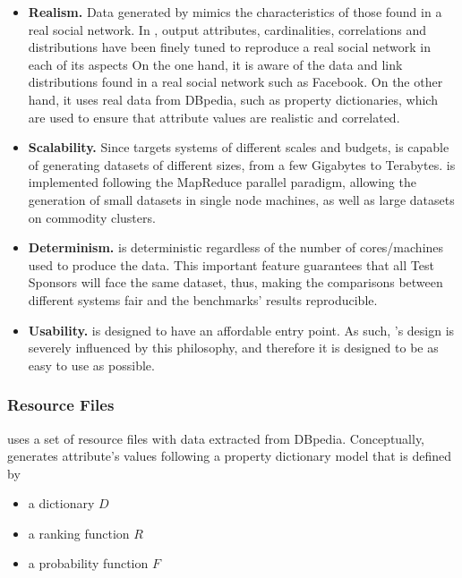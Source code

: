 \begin{itemize}
    \item \textbf{Realism.} Data generated by \datagen mimics the
        characteristics of those found in a real social network. In \datagen,
        output attributes, cardinalities, correlations and distributions have
        been finely tuned to reproduce a real social network in each of its
        aspects On the one hand, it is aware of the  data and link distributions
        found in a real social network such as Facebook. On the other hand, it
        uses real data from DBpedia, such as property dictionaries, which are
        used to ensure that attribute values are realistic and correlated.
    \item \textbf{Scalability.} Since \ldbcsnb targets systems of different
        scales and budgets, \datagen is capable of generating datasets of
        different sizes, from a few Gigabytes to Terabytes. \datagen is
        implemented following the MapReduce parallel paradigm, allowing the
        generation of small datasets in single node machines, as well as large
        datasets on commodity clusters.
    \item \textbf{Determinism.} \datagen is deterministic regardless of the number
        of cores/machines used to produce the data. This important feature
        guarantees that all Test Sponsors will face the same dataset,
        thus, making the comparisons between different systems fair and the
        benchmarks' results reproducible.
    \item \textbf{Usability.} \ldbcsnb is designed to have an affordable entry
        point. As such, \datagen's design is  severely influenced by this
        philosophy, and therefore it is designed to be as easy to use as
        possible.
\end{itemize}


\subsubsection{Resource Files}

\datagen uses a set of resource files with data
extracted from DBpedia. Conceptually, \datagen generates attribute's
values following a property dictionary model that is defined by

\begin{itemize}
    \item a dictionary $D$
    \item a ranking function $R$
    \item a probability function $F$
\end{itemize}

